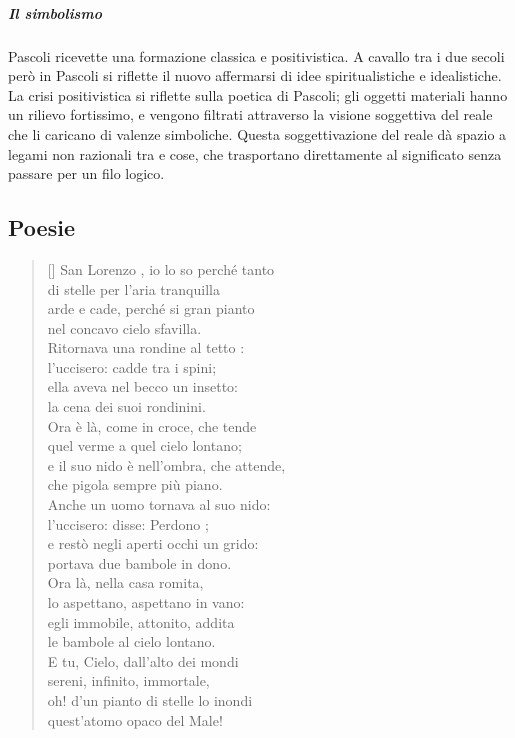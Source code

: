 \documentclass[10pt]{report}
\begin{document}
		\subparagraph[Simbolismo]{Il simbolismo}Pascoli ricevette una formazione classica e positivistica. A cavallo tra i due secoli però in Pascoli si riflette il nuovo affermarsi di idee spiritualistiche e idealistiche. La crisi positivistica si riflette sulla poetica di Pascoli; gli oggetti materiali hanno un rilievo fortissimo, e vengono filtrati attraverso la visione soggettiva del reale che li caricano di valenze simboliche. Questa soggettivazione del reale dà spazio a legami non razionali tra e cose, che trasportano direttamente al significato senza passare per un filo logico.

		\subsection[Poesie]{Poesie}
		
			\renewcommand{\poemtoc}{subsection}
		\settowidth{\versewidth}{There was an old party of Lyme}
		
		\begin{verse}[\versewidth]
			San Lorenzo , io lo so perché tanto\\
			di stelle per l'aria tranquilla\\
			arde e cade, perché si gran pianto\\
			nel concavo cielo sfavilla.\\
			
			
			Ritornava una rondine al tetto :\\
			l'uccisero: cadde tra i spini;\\
			ella aveva nel becco un insetto:\\
			la cena dei suoi rondinini.\\
			
			
			Ora è là, come in croce, che tende\\
			quel verme a quel cielo lontano;\\
			e il suo nido è nell'ombra, che attende,\\
			che pigola sempre più piano.\\
			
			
			Anche un uomo tornava al suo nido:\\
			l'uccisero: disse: Perdono ;\\
			e restò negli aperti occhi un grido: \\
			portava due bambole in dono.\\
			
			
			Ora là, nella casa romita,\\
			lo aspettano, aspettano in vano:\\
			egli immobile, attonito, addita\\
			le bambole al cielo lontano.\\
			
			
			E tu, Cielo, dall'alto dei mondi\\
			sereni, infinito, immortale,\\
			oh! d'un pianto di stelle lo inondi\\
			quest'atomo opaco del Male!\\
		\end{verse}
	
\end{document}
